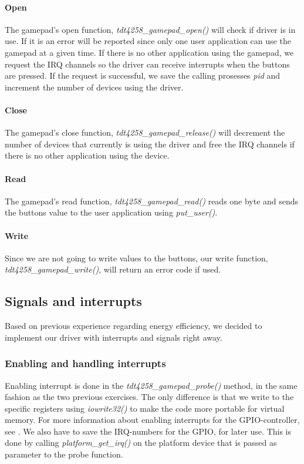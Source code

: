 \paragraph{Open} The gamepad's open function, \emph{tdt4258\_gamepad\_open()} will check if driver is in use. If it is an error will be reported since only one user application can use the gamepad at a given time. If there is no other application using the gamepad, we request the IRQ channels so the driver can receive interrupts when the buttons are pressed. If the request is successful, we save the calling prosesses \emph{pid} and increment the number of devices using the driver.    
\paragraph{Close} The gamepad's close function, \emph{tdt4258\_gamepad\_release()} will decrement the number of devices that currently is using the driver and free the IRQ channels if there is no other application using the device.
\paragraph{Read} The gamepad's read function, \emph{tdt4258\_gamepad\_read()} reads one byte and sends the buttons value to the user application using \emph{put\_user()}. 
\paragraph{Write} Since we are not going to write values to the buttons, our write function, \emph{tdt4258\_gamepad\_write()}, will return an error code if used.

\subsection{Signals and interrupts}
\label{subsection:signals-and-interrupts}
Based on previous experience regarding energy efficiency, we decided to implement our driver with interrupts and signals right away.
\subsubsection{Enabling and handling interrupts}

Enabling interrupt is done in the \emph{tdt4258\_gamepad\_probe()} method, in the same fashion as the two previous exercises. The only difference is that we write to the specific registers using \emph{iowrite32()} to make the code more portable for virtual memory. For more information about enabling interrupts for the GPIO-controller, see \cite[section 3]{compendium}. We also have to save the IRQ-numbers for the GPIO, for later use. This is done by calling \emph{platform\_get\_irq()} on the platform device that is passed as parameter to the probe function.\\

